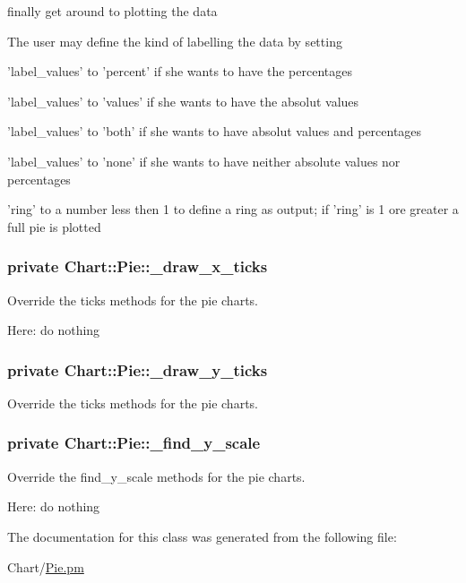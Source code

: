 finally get around to plotting the data 

The user may define the kind of labelling the data by setting\par
 'label\_\-values' to 'percent' if she wants to have the percentages\par
 'label\_\-values' to 'values' if she wants to have the absolut values\par
 'label\_\-values' to 'both' if she wants to have absolut values and percentages\par
 'label\_\-values' to 'none' if she wants to have neither absolute values nor percentages\par
 'ring' to a number less then 1 to define a ring as output; if 'ring' is 1 ore greater a full pie is plotted\par
 \hypertarget{classChart_1_1Pie_ac4809da05e978fb109873de806d75b35}{
\subsubsection[{\_\-draw\_\-x\_\-ticks}]{\setlength{\rightskip}{0pt plus 5cm}private {\bf Chart::Pie::\_\-draw\_\-x\_\-ticks}}}
\label{classChart_1_1Pie_ac4809da05e978fb109873de806d75b35}


Override the ticks methods for the pie charts. 

\par
 Here: do nothing \hypertarget{classChart_1_1Pie_adaf9a2d4a6b552f205e3455b61c687cb}{
\subsubsection[{\_\-draw\_\-y\_\-ticks}]{\setlength{\rightskip}{0pt plus 5cm}private {\bf Chart::Pie::\_\-draw\_\-y\_\-ticks}}}
\label{classChart_1_1Pie_adaf9a2d4a6b552f205e3455b61c687cb}


Override the ticks methods for the pie charts. 

\par
 \hypertarget{classChart_1_1Pie_ae2d77fbce88ae7e1a9e37b8a5cdcb5cb}{
\subsubsection[{\_\-find\_\-y\_\-scale}]{\setlength{\rightskip}{0pt plus 5cm}private {\bf Chart::Pie::\_\-find\_\-y\_\-scale}}}
\label{classChart_1_1Pie_ae2d77fbce88ae7e1a9e37b8a5cdcb5cb}


Override the find\_\-y\_\-scale methods for the pie charts. 

\par
 Here: do nothing 

The documentation for this class was generated from the following file:\begin{DoxyCompactItemize}
\item 
Chart/\hyperlink{Pie_8pm}{Pie.pm}\end{DoxyCompactItemize}
